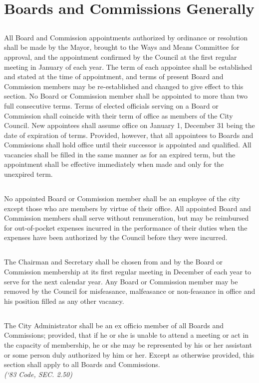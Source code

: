 \section{Boards and Commissions Generally}
\subsection{}
All Board and Commission appointments authorized by ordinance or resolution shall be made by the Mayor, brought to the Ways and Means Committee for approval, and the appointment confirmed by the Council at the first regular meeting in January of each year.  The term of each appointee shall be established and stated at the time of appointment, and terms of present Board and Commission members may be re-established and changed to give effect to this section. No Board or Commission member shall be appointed to more than two full consecutive terms. Terms of elected officials serving on a Board or Commission shall coincide with their term of office as members of the City Council. New appointees shall assume office on January 1, December 31 being the date of expiration of terms. Provided, however, that all appointees to Boards and Commissions shall hold office until their successor is appointed and qualified. All vacancies shall be filled in the same manner as for an expired term, but the appointment shall be effective immediately when made and only for the unexpired term.
\subsection{}
No appointed Board or Commission member shall be an employee of the city except those who are members by virtue of their office. All appointed Board and Commission members shall serve without remuneration, but may be reimbursed for out-of-pocket expenses incurred in the performance of their duties when the expenses have been authorized by the Council before they were incurred.
\subsection{}
The Chairman and Secretary shall be chosen from and by the Board or Commission membership at its first regular meeting in December of each year to serve for the next calendar year. Any Board or Commission member may be removed by the Council for misfeasance, malfeasance or non-feasance in office and his position filled as any other vacancy.
\subsection{}
The City Administrator shall be an ex officio member of all Boards and Commissions; provided, that if he or she is unable to attend a meeting or act in the capacity of membership, he or she may be represented by his or her assistant or some person duly authorized by him or her. Except as otherwise provided, this section shall apply to all Boards and Commissions.\\
\emph{(‘83 Code, SEC. 2.50)}\\

